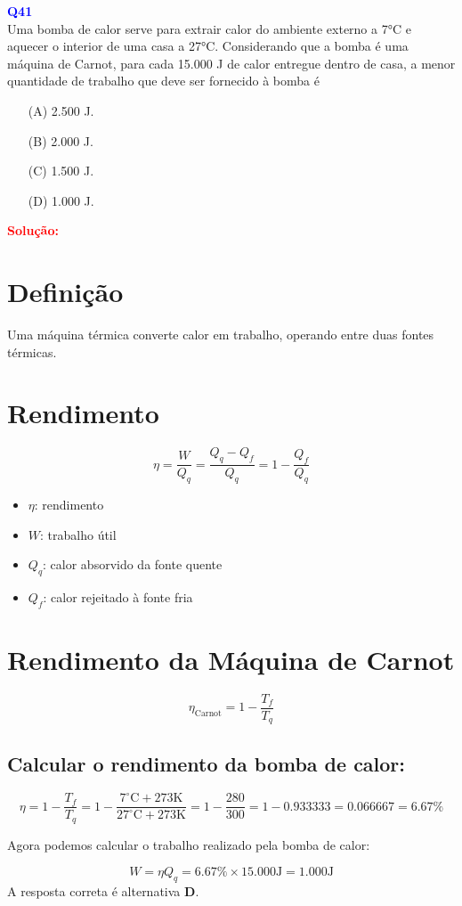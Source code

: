 \documentclass[a4paper,12pt]{article}
\begin{document}
\begin{flushleft}
\textbf{\textcolor{blue}{\Large Q41}}\\
\noindent
Uma bomba de calor serve para extrair calor do ambiente
externo a 7°C e aquecer o interior de uma casa a 27°C.
Considerando que a bomba é uma máquina de Carnot, para
cada 15.000 J de calor entregue dentro de casa, a menor
quantidade de trabalho que deve ser fornecido à bomba é

\begin{itemize}
\item[(A)] 2.500 J.
\item[(B)] 2.000 J.
\item[(C)] 1.500 J.
\item[(D)] 1.000 J.
\end{itemize}

\vspace{0.5cm}

\textcolor{red}{\textbf{Solução:}}\\

\section*{Definição}

Uma máquina térmica converte calor em trabalho, operando entre duas fontes térmicas.

\section*{Rendimento}

\[
\eta = \frac{W}{Q_q} = \frac{Q_q - Q_f}{Q_q} = 1 - \frac{Q_f}{Q_q}
\]

\begin{itemize}
  \item \( \eta \): rendimento
  \item \( W \): trabalho útil
  \item \( Q_q \): calor absorvido da fonte quente
  \item \( Q_f \): calor rejeitado à fonte fria
\end{itemize}

\section*{Rendimento da Máquina de Carnot}

\[
\eta_{\text{Carnot}} = 1 - \frac{T_f}{T_q}
\]

\subsection*{Calcular o rendimento da bomba de calor:}

\[
\eta = 1 - \frac{T_f}{T_q} = 1 - \frac{7^{\circ}\textrm{C} + 273\textrm{K}}{27^{\circ}\textrm{C}+ 273\textrm{K}} = 1 - \frac{280}{300} = 1 - 0.933333 = 0.066667 = 6.67\%
\]

Agora podemos calcular o trabalho realizado pela bomba de calor:

\[
  W = \eta Q_q = 6.67\% \times 15.000 \textrm{J} = 1.000 \textrm{J}
\]
A resposta correta é alternativa \colorbox{green!50}{\textbf{D}}.
\end{flushleft}
\end{document}
